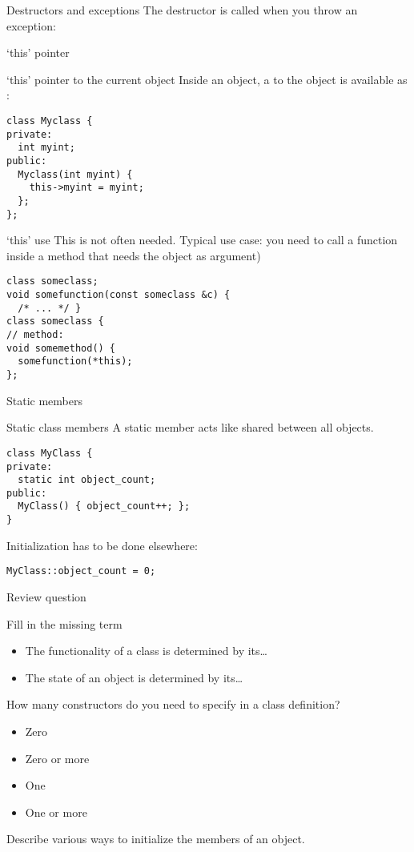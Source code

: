 \begin{block}{Destructors and exceptions}
  \label{sl:exceptobj}
  The destructor is called when you throw an exception:
\end{block}



 {`this' pointer}

\begin{block}{`this' pointer to the current object}
  \label{sl:class-this}
  Inside an object, a  to the object is available
  as :
\begin{lstlisting}
class Myclass {
private:
  int myint;
public:
  Myclass(int myint) {
    this->myint = myint;
  };
};
\end{lstlisting}
\end{block}
\begin{block}{`this' use}
  \label{sl:class-this-fun}
This is not often needed. Typical use case:
you need to call a function inside a method that needs the object as argument)
\begin{lstlisting}
class someclass;
void somefunction(const someclass &c) {
  /* ... */ }
class someclass {
// method:
void somemethod() {
  somefunction(*this);
};
\end{lstlisting}
\end{block}

 {Static members}

\begin{block}{Static class members}
  \label{sl:static-member}
  A static member acts like shared between all objects.
\begin{lstlisting}
class MyClass {
private:
  static int object_count;
public:
  MyClass() { object_count++; };
}
\end{lstlisting}
Initialization has to be done elsewhere:
\begin{lstlisting}
MyClass::object_count = 0;
\end{lstlisting}
\end{block}

 {Review question}

\begin{exercise}
  \label{ex:class-review1}
  Fill in the missing term
  \begin{itemize}
  \item The functionality of a class is determined by its\ldots
  \item The state of an object is determined by its\ldots
  \end{itemize}

  How many constructors do you need to specify in a class definition?
  \begin{itemize}
  \item Zero
  \item Zero or more
  \item One
  \item One or more
  \end{itemize}
\end{exercise}

\begin{exercise}
  \label{ex:class-review2}
  Describe various ways to initialize the members of an object.
\end{exercise}

